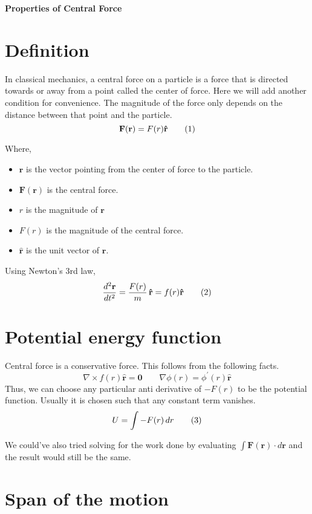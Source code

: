 \documentclass[a4paper, 12pt]{article}
\renewcommand{\indent}{\hspace{3ex}}
\newcommand\labelthis[1]{\addtocounter{equation}{1}\tag{\theequation}\label{#1}}
\renewcommand{\maketitle}{
	\begin{center}
		\Huge\bfseries{Properties of Central Force}
	\end{center}
	\bigskip
}
\renewcommand{\r}{\mathbf{r}}
\newcommand{\ru}{\mathbf{\hat{r}}}
\renewcommand{\vec}[1]{\mathbf{#1}}
\newcommand{\ddtII}[1]{\frac{d^2#1}{dt^2}}
\begin{document}
\maketitle

\section{Definition}\label{definition}

\indent In classical mechanics, a central force on a particle is a force that is directed towards or away from a point called the center of force. Here we will add another condition for convenience. The magnitude of the force only depends on the distance between that point and the particle.
\[ \vec{F}(\r) = F(r) \ru \labelthis{eq:def central force} \]

Where,
\begin{itemize}
	\item $\r$ is the vector pointing from the center of force to the particle.
	\item $\vec{F}(\r)$ is the central force.
	\item $r$ is the magnitude of $\r$
	\item $F(r)$ is the magnitude of the central force.
	\item $\ru$ is the unit vector of $\r$.
\end{itemize}

Using Newton's 3rd law,
\[ \ddtII{\r} = \frac{F(r)}{m} \, \ru = f(r) \ru \labelthis{eq:def central acceleration} \]

\section{Potential energy function}\label{potential energy}

Central force is a conservative force. This follows from the following facts.
\[ \nabla \times f(r) \ru = \mathbf{0} \hspace{2em} \nabla \phi(r) = \phi^{'}(r) \ru \]
Thus, we can choose any particular anti derivative of $- F(r)$ to be the potential function. Usually it is chosen such that any constant term vanishes.
\[ U = \int - F(r) \, dr \labelthis{eq:potential energy} \]

We could've also tried solving for the work done by evaluating $\int \vec{F}(\r) \cdot d\r$ and the result would still be the same.

\section{Span of the motion}\label{span of motion}
\end{document}
